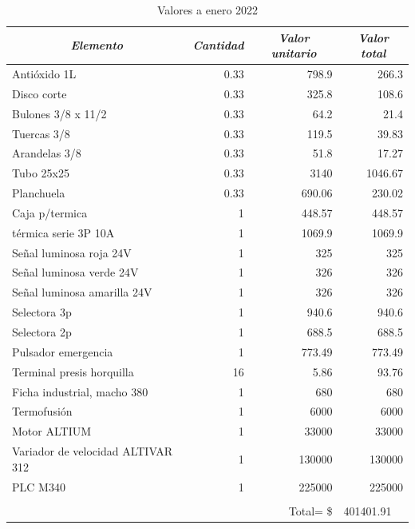 \begin{table}[h!]
	\centering
	\caption{Valores a enero 2022}
	\label{tab:presu}
	\begin{tabular}{|l|r|r|r|}
		\hline
		\multicolumn{1}{|c|}{\textit{\textbf{Elemento}}} & \multicolumn{1}{c|}{\textit{\textbf{Cantidad}}} & \multicolumn{1}{c|}{\textit{\textbf{Valor unitario}}} & \multicolumn{1}{c|}{\textit{\textbf{Valor total}}} \\ \hline
		Antióxido 1L & 0.33 & 798.9 & 266.3 \\ \hline
		Disco corte & 0.33 & 325.8 & 108.6 \\ \hline
		Bulones 3/8 x 11/2 & 0.33 & 64.2 & 21.4 \\ \hline
		Tuercas 3/8 & 0.33 & 119.5 & 39.83 \\ \hline
		Arandelas 3/8 & 0.33 & 51.8 & 17.27 \\ \hline
		Tubo 25x25 & 0.33 & 3140 & 1046.67 \\ \hline
		Planchuela & 0.33 & 690.06 & 230.02 \\ \hline
		Caja p/termica & 1 & 448.57 & 448.57 \\ \hline
		térmica serie 3P 10A & 1 & 1069.9 & 1069.9 \\ \hline
		Señal luminosa roja 24V & 1 & 325 & 325 \\ \hline
		Señal luminosa verde 24V & 1 & 326 & 326 \\ \hline
		Señal luminosa amarilla 24V & 1 & 326 & 326 \\ \hline
		Selectora 3p & 1 & 940.6 & 940.6 \\ \hline
		Selectora 2p & 1 & 688.5 & 688.5 \\ \hline
		Pulsador emergencia & 1 & 773.49 & 773.49 \\ \hline
		Terminal presis horquilla & 16 & 5.86 & 93.76 \\ \hline
		Ficha industrial, macho 380 & 1 & 680 & 680 \\ \hline
		Termofusión & 1 & 6000 & 6000 \\ \hline
		Motor ALTIUM & 1 & 33000 & 33000 \\ \hline
		Variador de velocidad ALTIVAR 312 & 1 & 130000 & 130000 \\ \hline
		PLC M340 & 1 & 225000 & 225000 \\ \hline
		& \multicolumn{1}{l|}{} &  & \multicolumn{1}{l|}{} \\ \hline
		& \multicolumn{1}{l|}{} & Total=    \$ & \multicolumn{1}{l|}{401401.91} \\ \hline
	\end{tabular}
\end{table}



\newpage
